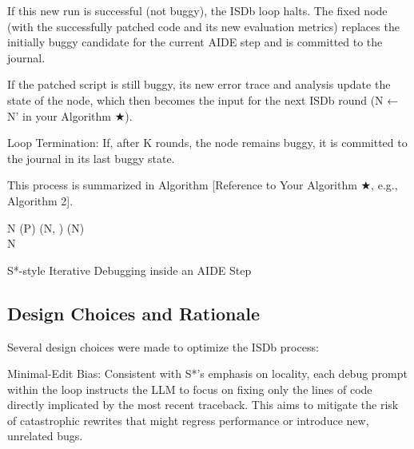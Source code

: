                 If this new run is successful (not buggy), the ISDb loop halts. The fixed node (with the successfully patched code and its new evaluation metrics) replaces the initially buggy candidate for the current AIDE step and is committed to the journal.

                If the patched script is still buggy, its new error trace and analysis update the state of the node, which then becomes the input for the next ISDb round (N ← N' in your Algorithm ★).

        Loop Termination: If, after K rounds, the node remains buggy, it is committed to the journal in its last buggy state.

    This process is summarized in Algorithm [Reference to Your Algorithm ★, e.g., Algorithm 2].

        
\begin{algorithm}[H]
\SetAlgoLined
{}
    N \leftarrow {}(P) 
    (N, ) \leftarrow {}(N) \\
    \Return N 
\caption{S*-style Iterative Debugging inside an AIDE Step}
\label{alg:s_star_debug}
\end{algorithm}

        

\subsection{Design Choices and Rationale}
Several design choices were made to optimize the ISDb process:

    Minimal-Edit Bias: Consistent with S*'s emphasis on locality, each debug prompt within the loop instructs the LLM to focus on fixing only the lines of code directly implicated by the most recent traceback. This aims to mitigate the risk of catastrophic rewrites that might regress performance or introduce new, unrelated bugs.

